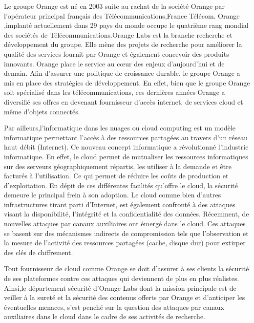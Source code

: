 Le groupe Orange est né en 2003 suite au  rachat de la société Orange par l'opérateur principal français des Télécommunications,France Télécom. Orange ,implanté actuellement dans 29 pays du monde occupe le quatrième rang mondial des sociétés de Télécommunications.Orange Labs est la branche recherche et développement du groupe. Elle mène des projets de recherche pour améliorer la qualité des services fournit par Orange et également concevoir des produits innovants. Orange place le service au cœur des enjeux d'aujourd'hui et de demain.
Afin  d'assurer une politique de croissance durable, le groupe Orange a mis en place des stratégies de développement. En effet, bien que le groupe Orange soit spécialisé dans les télécommunications, ces dernières années Orange a diversifié ses offres en devenant fournisseur d'accès internet, de services cloud et même d'objets connectés. \newline{}
\newline
\par 
Par ailleurs,l'informatique dans les nuages ou cloud computing est un modèle  informatique permettant  l'accès à des ressources partagées au travers d'un réseau haut débit (Internet). Ce nouveau concept informatique a révolutionné l'industrie informatique.  En effet, le cloud permet de  mutualiser les ressources informatiques sur des serveurs géographiquement répartis, les utiliser à la demande et être facturés à l'utilisation. Ce qui permet de réduire les coûts de production et d'exploitation. En dépit de ces différentes facilités qu'offre le  cloud, la sécurité demeure  le principal  frein  à son  adoption.  Le cloud comme bien d'autres infrastructures tirant parti d'Internet, est également confronté à des attaques visant la disponibilité, l'intégrité et la confidentialité des données. Récemment, de nouvelles attaques  par  canaux auxiliaires  ont émergé dans le cloud. Ces attaques se basent sur des mécanismes indirects de compromission  tels que l'observation  et la mesure de l'activité des ressources partagées (cache, disque dur)  pour extirper des clés de chiffrement. \newline{}
\newline
\par 
Tout fournisseur de cloud comme Orange se doit d'assurer à ses clients la sécurité de ses plateformes contre ces attaques qui deviennent de plus en plus réalistes.
Ainsi,le département sécurité d'Orange Labs dont la mission  principale est  de veiller à la sureté et la sécurité des contenus offerts par Orange et d'anticiper les éventuelles menaces, s'est penché sur la question des attaques par canaux auxiliaires dans le cloud dans le cadre de ses activités de recherche. 
